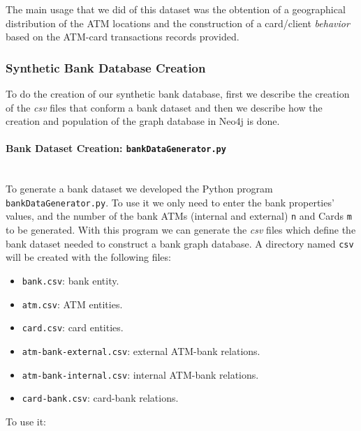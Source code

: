 The main usage that we did of this dataset was the obtention of a geographical distribution of the ATM locations and the construction 
of a card/client \emph{behavior} based on the ATM-card transactions records provided.

\subsubsection{Synthetic Bank Database Creation}

To do the creation of our synthetic bank database, first we describe the creation of the \emph{csv} files that conform a bank dataset 
and then we describe how the creation and population of the graph database in Neo4j is done.

\paragraph{Bank Dataset Creation: \texttt{bankDataGenerator.py}\\\\}
\label{bankDataGenerator}
\noindent
To generate a bank dataset we developed the Python program \texttt{bankDataGenerator.py}. 
To use it we only need to enter the bank properties' values, and the number of the bank ATMs (internal and external) 
\texttt{n} and Cards \texttt{m} to be generated. With this program we can generate the \emph{csv} files which define 
the bank dataset needed to construct a bank graph database. A directory named \texttt{csv} will be created with the following files: 

\begin{itemize}
    \item \texttt{bank.csv}: bank entity.
    \item \texttt{atm.csv}: ATM entities.
    \item \texttt{card.csv}: card entities.
    \item \texttt{atm-bank-external.csv}: external ATM-bank relations.
    \item \texttt{atm-bank-internal.csv}: internal ATM-bank relations.
    \item \texttt{card-bank.csv}: card-bank relations.
\end{itemize}
To use it:

